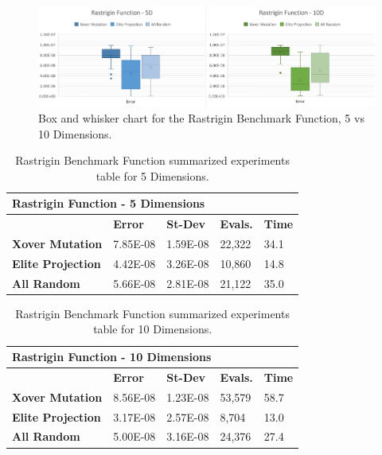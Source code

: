 \documentclass[graybox]{svmult}
\begin{document}
            \begin{figure}
                \includegraphics[width=\linewidth, frame]{img/fig_fun_rastrigin.pdf}
                \caption{Box and whisker chart for the Rastrigin Benchmark Function, 5 vs 10 Dimensions.} \label{fig.fun_rastrigin}
                \end{figure}

            \begin{table}[]
                \scriptsize
                \centering
                \caption{Rastrigin Benchmark Function summarized experiments table for 5 Dimensions.}\label{tab.fun_rastrigin5}
                \begin{tabular}{@{}lllll@{}}
                \toprule
                \multicolumn{5}{l}{\textbf{Rastrigin Function - 5 Dimensions}} \\ \midrule
                & \textbf{Error} & \textbf{St-Dev} & \textbf{Evals.} & \textbf{Time} \\
                \textbf{Xover Mutation} & 7.85E-08 & 1.59E-08 & 22,322 & 34.1 \\
                \textbf{Elite Projection} & 4.42E-08 & 3.26E-08 & 10,860 & 14.8 \\
                \textbf{All Random} & 5.66E-08 & 2.81E-08 & 21,122 & 35.0 \\ \bottomrule
                \end{tabular}
                \end{table}

            \begin{table}[]
                \scriptsize
                \centering
                \caption{Rastrigin Benchmark Function summarized experiments table for 10 Dimensions.}\label{tab.fun_rastrigin10}
                \begin{tabular}{@{}lllll@{}}
                \toprule
                \multicolumn{5}{l}{\textbf{Rastrigin Function - 10   Dimensions}} \\ \midrule
                & \textbf{Error} & \textbf{St-Dev} & \textbf{Evals.} & \textbf{Time} \\
                \textbf{Xover Mutation} & 8.56E-08 & 1.23E-08 & 53,579 & 58.7 \\
                \textbf{Elite Projection} & 3.17E-08 & 2.57E-08 & 8,704 & 13.0 \\
                \textbf{All Random} & 5.00E-08 & 3.16E-08 & 24,376 & 27.4 \\ \bottomrule
                \end{tabular}
                \end{table}
\end{document}
